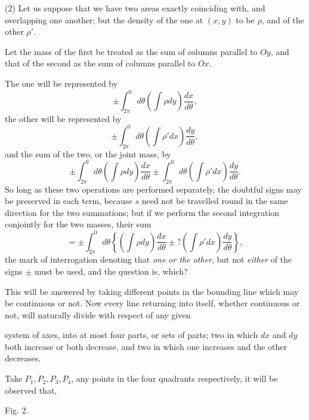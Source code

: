 \documentclass[11pt]{article}
\newcommand{\sourcepage}[1]{\marginpar{\scriptsize p.~#1}}
\begin{document}
(2) Let us suppose that we have two areas exactly coinciding with, and overlapping one another; but the density of the one at $(x,y)$ to be $\rho$, and of the other $\rho'$.

Let the mass of the first be treated as the sum of columns parallel to $Oy$, and that of the second as the sum of columns parallel to $Ox$.

The one will be represented by
\[
\pm\int_{2\pi}^{0}d\theta\left(\int\rho dy\right)\frac{dx}{d\theta},
\]
the other will be represented by
\[
\pm\int_{2\pi}^{0}d\theta\left(\int\rho' dx\right)\frac{dy}{d\theta},
\]
and the sum of the two, or the joint mass, by
\[
\pm\int_{2\pi}^{0}d\theta\left(\int\rho dy\right)\frac{dx}{d\theta}
\pm\int_{2\pi}^{0}d\theta\left(\int\rho' dx\right)\frac{dy}{d\theta}.
\]
So long as these two operations are performed separately, the doubtful signs may be preserved in each term, because $s$ need not be travelled round in the same direction for the two summations; but if we perform the second integration conjointly for the two masses, their sum
\[
=\pm\int_{2\pi}^{0}d\theta\left\{\left(\int\rho dy\right)\frac{dx}{d\theta}\pm ?\left(\int\rho' dx\right)\frac{dy}{d\theta}\right\},
\]
the mark of interrogation denoting that \emph{one or the other}, but not \emph{either} of the signs $\pm$ must be used, and the question is, which?

This will be answered by taking different points in the bounding line which may be continuous or not. Now every line returning into itself, whether continuous or not, will naturally divide with respect of any given

\sourcepage{38}
system of axes, into at most four parts, or sets of parts; two in which $dx$ and $dy$ both increase or both decrease, and two in which one increases and the other decreases.

Take $P_1,P_2,P_3,P_4$, any points in the four quadrants respectively, it will be observed that,

\begin{center}
\par\small Fig. 2.
\end{center}
\end{document}
